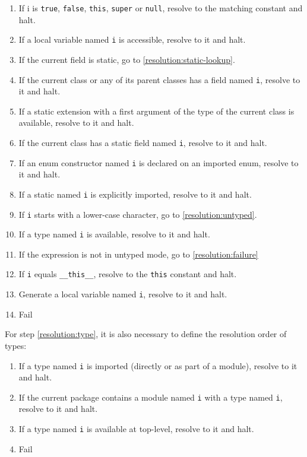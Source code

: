 \documentclass{article}
\newcommand{\expr}[1]{\texttt{#1}}
\begin{document}
\begin{enumerate}
	\item If i is \expr{true}, \expr{false}, \expr{this}, \expr{super} or \expr{null}, resolve to the matching constant and halt.
	\item If a local variable named \expr{i} is accessible, resolve to it and halt.
	\item If the current field is static, go to \ref{resolution:static-lookup}.
	\item If the current class or any of its parent classes has a field named \expr{i}, resolve to it and halt.
	\item\label{resolution:static-extension} If a static extension with a first argument of the type of the current class is available, resolve to it and halt.
	\item\label{resolution:static-lookup} If the current class has a static field named \expr{i}, resolve to it and halt.
	\item\label{resolution:enum-ctor} If an enum constructor named \expr{i} is declared on an imported enum, resolve to it and halt.
	\item If a static named \expr{i} is explicitly imported, resolve to it and halt.
	\item If \expr{i} starts with a lower-case character, go to \ref{resolution:untyped}.
	\item\label{resolution:type} If a type named \expr{i} is available, resolve to it and halt.
	\item\label{resolution:untyped} If the expression is not in untyped mode, go to \ref{resolution:failure}
	\item If \expr{i} equals \expr{__this__}, resolve to the \expr{this} constant and halt.
	\item Generate a local variable named \expr{i}, resolve to it and halt.
	\item\label{resolution:failure} Fail
\end{enumerate}

For step \ref{resolution:type}, it is also necessary to define the resolution order of types:

\begin{enumerate}
	\item\label{resolution:import} If a type named \expr{i} is imported (directly or as part of a module), resolve to it and halt.
	\item If the current package contains a module named \expr{i} with a type named \expr{i}, resolve to it and halt.
	\item If a type named \expr{i} is available at top-level, resolve to it and halt.
	\item Fail
\end{enumerate}
\end{document}
